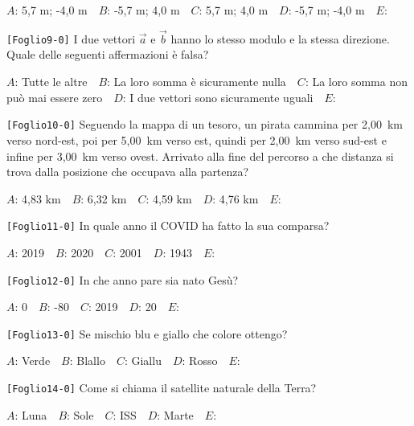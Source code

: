 {$A$}: 5,7 m; -4,0 m\ \ 
{$B$}: -5,7 m; 4,0 m\ \ 
{$C$}: 5,7 m; 4,0 m\ \ 
{$D$}: -5,7 m; -4,0 m\ \ 
{$E$}: \ \ 


\noindent
{\tt [{Foglio9-0}]} I due vettori $\vec{a}$ e $\vec{b}$ hanno lo stesso modulo e la stessa direzione. Quale delle seguenti affermazioni è falsa?

{$A$}: Tutte le altre\ \ 
{$B$}: La loro somma è sicuramente nulla\ \ 
{$C$}: La loro somma non può mai essere zero\ \ 
{$D$}: I due vettori sono sicuramente uguali\ \ 
{$E$}: \ \ 


\noindent
{\tt [{Foglio10-0}]} Seguendo la mappa di un tesoro, un pirata cammina per 2,00~km verso nord-est, poi per 5,00~km verso est, quindi per 2,00~km verso sud-est e infine per 3,00~km verso ovest. Arrivato alla fine del percorso a che distanza si trova dalla posizione che occupava alla partenza?

{$A$}: 4,83 km\ \ 
{$B$}: 6,32 km\ \ 
{$C$}: 4,59 km\ \ 
{$D$}: 4,76 km\ \ 
{$E$}: \ \ 


\noindent
{\tt [{Foglio11-0}]} In quale anno il COVID ha fatto la sua comparsa?

{$A$}: 2019\ \ 
{$B$}: 2020\ \ 
{$C$}: 2001\ \ 
{$D$}: 1943\ \ 
{$E$}: \ \ 


\noindent
{\tt [{Foglio12-0}]} In che anno pare sia nato Gesù?

{$A$}: 0\ \ 
{$B$}: -80\ \ 
{$C$}: 2019\ \ 
{$D$}: 20\ \ 
{$E$}: \ \ 


\noindent
{\tt [{Foglio13-0}]} Se mischio blu e giallo che colore ottengo?

{$A$}: Verde\ \ 
{$B$}: Blallo\ \ 
{$C$}: Giallu\ \ 
{$D$}: Rosso\ \ 
{$E$}: \ \ 


\noindent
{\tt [{Foglio14-0}]} Come si chiama il satellite naturale della Terra?

{$A$}: Luna\ \ 
{$B$}: Sole\ \ 
{$C$}: ISS\ \ 
{$D$}: Marte\ \ 
{$E$}: \ \ 
